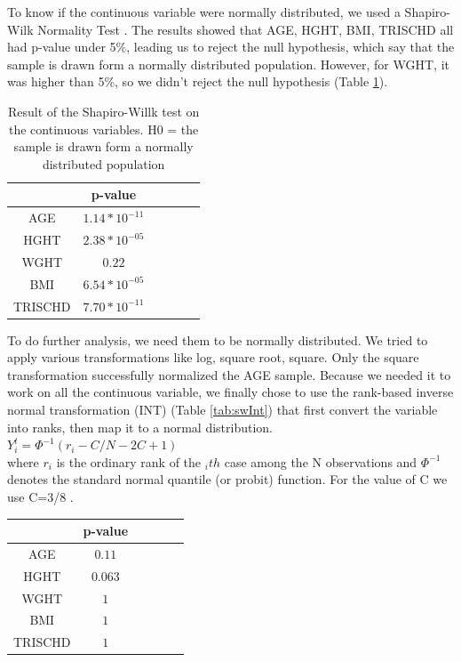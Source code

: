 \documentclass[a4paper, 11pt]{article}
\begin{document}
\begin{multicols}{2}
To know if the continuous variable were normally distributed, we used a Shapiro-Wilk Normality Test \citep{R:2024}. 
The results showed that AGE, HGHT, BMI, TRISCHD all had p-value under 5\%, leading us to reject the null hypothesis, which say that the sample is drawn form a normally distributed population. 
However, for WGHT, it was higher than 5\%, so we didn’t reject the null hypothesis (Table \ref{tab:swNum}). 

\begin{table}[H]
\begin{center}
	\setlength{\tabcolsep}{0.5pt}
	\begin{tabular}{ |c|c|c|c|c|c| } 
	\hline 
	& p-value   \\[0.2cm] 
	\hline
	 AGE &\small $1.14*10^{-11} $   \\ [0.1cm]
	\hline
	 HGHT &\small $2.38*10^{-05} $  \\[0.1cm]
	\hline
	 WGHT & \small $ 0.22 $  \\[0.1cm]
	\hline
	 BMI &   \small $6.54*10^{-05}  $ \\[0.1cm]
	\hline
	 TRISCHD &\small $7.70*10^{-11}$ \\[0.1cm]
	\hline
	 
\end{tabular}
\end{center}
\caption{Result of the Shapiro-Willk test on the continuous variables. H0 = the sample is drawn form a normally distributed population}
\label{tab:swNum}
\end{table}






To do further analysis, we need them to be normally distributed. 
We tried to apply various transformations like log, square root, square. 
Only the square transformation successfully normalized the AGE sample. 
Because we needed it to work on all the continuous variable, we finally chose to use the rank-based inverse normal transformation (INT) (Table \ref{tab:swInt})
that first convert the variable into ranks, then map it to a normal distribution. 
\\
$ Y^t_{i}=  \Phi^{-1}(r_i-C/N-2C+1) $ %
\\

where $r_i$ is the ordinary rank of the $_ith$ case among the N observations and $\Phi^{-1}$ denotes the standard normal quantile (or probit) function.
For the value of C we use C=3/8 \citep{beasley2009rank}. %
\begin{table}[H]
\begin{center}
	\setlength{\tabcolsep}{0.5pt}
	\begin{tabular}{ |c|c|c|c|c|c| } 
	\hline 
	& p-value   \\[0.2cm] 
	\hline
	 AGE &\small $0.11 $   \\ [0.1cm]
	\hline
	 HGHT & \small $0.063 $ \\[0.1cm]
	\hline
	 WGHT & \small $ 1 $   \\[0.1cm]
	\hline
	 BMI &  \small $1 $\\[0.1cm]
	\hline
	 TRISCHD &\small $1$  \\[0.1cm]
	\hline
	 

\end{tabular}
\end{center}
\end{table}
\end{multicols}
\end{document}
